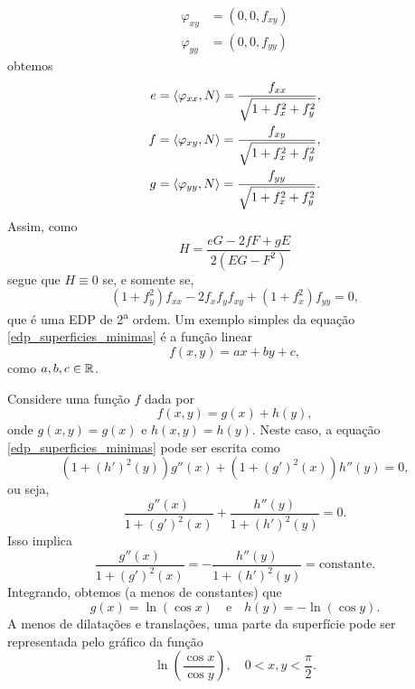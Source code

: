 \begin{exemplo}
\begin{align*}
	\varphi_{xy} &= (0, 0, f_{xy})\\
	\varphi_{yy} &= (0, 0, f_{yy})
	\end{align*}
	obtemos
	\begin{align*}
	e &= \left\langle \varphi_{xx},N \right\rangle = \frac{f_{xx}}{\sqrt{1 + f_x^2 + f_y^2}},\\
	f &= \left\langle \varphi_{xy},N \right\rangle = \frac{f_{xy}}{\sqrt{1 + f_x^2 + f_y^2}},\\
	g &= \left\langle \varphi_{yy},N \right\rangle = \frac{f_{yy}}{\sqrt{1 + f_x^2 + f_y^2}}.
	\end{align*}
	Assim, como
	\begin{equation*}
	H = \frac{eG - 2fF + gE}{2(EG - F^2)}
	\end{equation*}
	segue que $H \equiv 0$ se, e somente se,
	\begin{equation}\label{edp_superficies_minimas}
	(1 + f_y^2) f_{xx}  - 2 f_x f_y f_{xy} + (1+f_x^2) f_{yy} = 0,
	\end{equation}
	que é uma EDP de 2\textsuperscript{a} ordem.
	Um exemplo simples da equação \eqref{edp_superficies_minimas} é a função linear
	\begin{equation*}
	f(x,y) = ax + by + c,
	\end{equation*}
	como $a, b, c \in \mathbb{R}$.
\end{exemplo}

\begin{exemplo}
	Considere uma função $f$ dada por
	\begin{equation*}
	f(x,y) = g(x) + h(y),
	\end{equation*}
	onde  $g(x,y)=g(x)$ e $h(x,y)=h(y)$. Neste caso, a equação \eqref{edp_superficies_minimas} pode ser escrita como
	\begin{equation*}
	(1 + (h')^2(y)) g''(x) + (1 + (g')^2(x)) h''(y) = 0,
	\end{equation*}
	ou seja,
	\begin{equation*}
	\frac{g''(x)}{1 + (g')^2(x)} + \frac{h''(y)}{1 + (h')^2(y)} = 0.
	\end{equation*}
	Isso implica
	\begin{equation*}
	\frac{g''(x)}{1 + (g')^2(x)} = - \frac{h''(y)}{1 + (h')^2(y)} = \text{constante}.
	\end{equation*}
	Integrando, obtemos (a menos de constantes) que
	\begin{equation*}
	g(x) = \ln (\cos x) \quad \text{e} \quad h(y) = -\ln (\cos y).
	\end{equation*}
	A menos de dilatações e translações, uma parte da superfície pode ser representada pelo gráfico da função
	\begin{equation*}
	\ln \left( \frac{\cos x}{\cos y} \right), \quad 0 < x,y < \frac{\pi}{2}.
	\end{equation*}
\end{exemplo}


